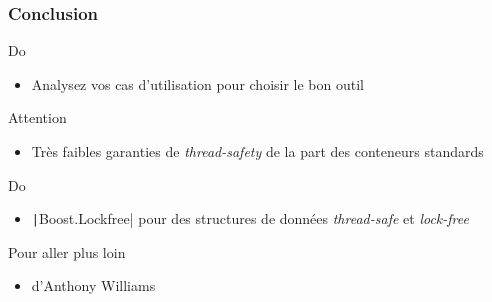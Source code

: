 \documentclass[C++.tex]{subfiles}
\begin{document}
\begin{frame}[fragile]
	\frametitle{Conclusion}
	\begin{exampleblock}{Do}
		\begin{itemize}
			\item Analysez vos cas d'utilisation pour choisir le bon outil
		\end{itemize}
	\end{exampleblock}

	\begin{alertblock}{Attention}
		\begin{itemize}
			\item Très faibles garanties de \textit{thread-safety} de la part des conteneurs standards
		\end{itemize}

	\end{alertblock}

	\begin{exampleblock}{Do}
		\begin{itemize}
			\item \texttt|Boost.Lockfree| pour des structures de données \textit{thread-safe} et \textit{lock-free}
		\end{itemize}
	\end{exampleblock}

	\begin{block}{Pour aller plus loin}
		\begin{itemize}
			\item \cite{ConcInAction} d'Anthony Williams
		\end{itemize}

	\end{block}
\end{frame}
\end{document}

